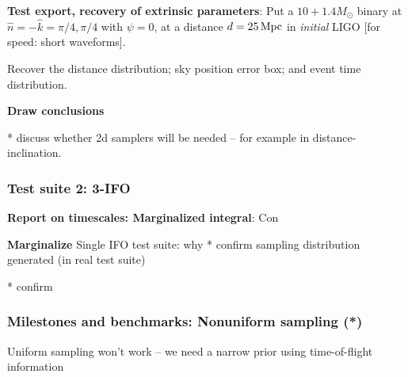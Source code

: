 \documentclass[twocolumn,prd,nofootinbib]{revtex4}
\newcommand\unit[1]{\, {\rm #1}}
\begin{document}
\begin{widetext}
\noindent \textbf{Test export, recovery of extrinsic parameters}: Put a $10+1.4 M_\odot$ binary  at
$\hat{n}=-\hat{k}=\pi/4,\pi/4$ with $\psi=0$, at a distance $d=25\unit{Mpc}$ in \emph{initial} LIGO [for speed: short
  waveforms].  

Recover the distance distribution;  sky position error box; and event time distribution.



\noindent \textbf{Draw conclusions}


* discuss whether 2d samplers will be needed -- for example in distance-inclination.

\subsubsection{Test suite 2: 3-IFO}



\noindent \textbf{Report on timescales: Marginalized integral}: Con


\noindent \textbf{Marginalize}
Single IFO test suite: why
* confirm sampling distribution generated (in real test suite)

* confirm 



\subsubsection{Milestones and benchmarks: Nonuniform sampling (*)} 
Uniform sampling won't work -- we need a narrow prior using time-of-flight information


\end{widetext}
\end{document}
